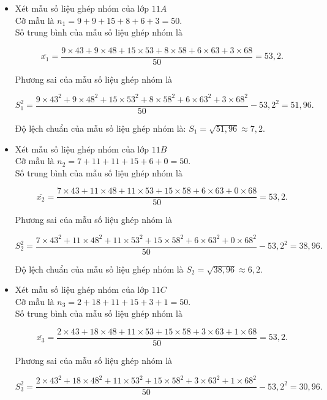 \begin{ex}
{\begin{itemize}
	\item Xét mẫu số liệu ghép nhóm của lớp $11A$\\
		
		Cỡ mẫu là $n_1=9+9+15+8+6+3=50$.\\
		
		Số trung bình của mẫu số liệu ghép nhóm là
		
		$$
		\overline{x_1}=\dfrac{9 \times 43+9 \times 48+15 \times 53+8 \times 58+6 \times 63+3 \times 68}{50}=53{,}2.
		$$
		
		Phương sai của mẫu số liệu ghép nhóm là
		
		$$
		S_1^2=\dfrac{9 \times 43^2+9 \times 48^2+15 \times 53^2+8 \times 58^2+6 \times 63^2+3 \times 68^2}{50}-53{,}2^2=51{,}96.
		$$
		
		Độ lệch chuẩn của mẫu số liệu ghép nhóm là: $S_1=\sqrt{51,96} \approx 7{,}2$.
	\item Xét mẫu số liệu ghép nhóm của lớp $11B$\\
		
		Cỡ mẫu là $n_2=7+11+11+15+6+0=50$.\\
		
		Số trung bình của mẫu số liệu ghép nhóm là
		
		$$
		\overline{x_2}=\dfrac{7 \times 43+11 \times 48+11 \times 53+15 \times 58+6 \times 63+0 \times 68}{50}=53{,}2.
		$$
		
		Phương sai của mẫu số liệu ghép nhóm là
		
		$$
		S_2^2=\dfrac{7 \times 43^2+11 \times 48^2+11 \times 53^2+15 \times 58^2+6 \times 63^2+0 \times 68^2}{50}-53{,}2^2=38{,}96.
		$$
		
		Độ lệch chuẩn của mẫu số liệu ghép nhóm là $S_2=\sqrt{38{,}96}\approx 6{,}2$.\\
		
		\item Xét mẫu số liệu ghép nhóm của lớp $11C$\\
		
		Cỡ mẫu là $n_3=2+18+11+15+3+1=50$.\\
		
		Số trung bình của mẫu số liệu ghép nhóm là
		
		$$
		\overline{x_3}=\dfrac{2 \times 43+18 \times 48+11 \times 53+15 \times 58+3 \times 63+1 \times 68}{50}=53{,}2.
		$$
		
		Phương sai của mẫu số liệu ghép nhóm là
		
		$$
		S_3^2=\dfrac{2 \times 43^2+18 \times 48^2+11 \times 53^2+15 \times 58^2+3 \times 63^2+1 \times 68^2}{50}-53{,}2^2=30{,}96.
		$$
		

\end{itemize}}
\end{ex}
